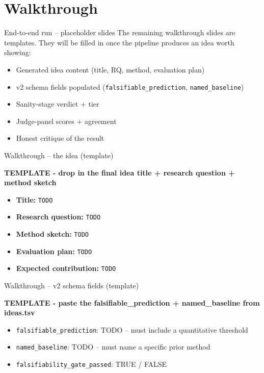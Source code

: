 \documentclass[10pt,aspectratio=169]{beamer}
\newcommand{\todoslide}[1]{%
  \begin{center}\large\color{warn}\bfseries TEMPLATE - #1\end{center}%
  \vspace{0.5em}%
}
\begin{document}

\section{Walkthrough}

\begin{frame}{End-to-end run -- placeholder slides}
  The remaining walkthrough slides are \alert{templates}. They will be
  filled in once the pipeline produces an idea worth showing:
  \begin{itemize}
    \item Generated idea content (title, RQ, method, evaluation plan)
    \item v2 schema fields populated (\texttt{falsifiable\_prediction},
      \texttt{named\_baseline})
    \item Sanity-stage verdict + tier
    \item Judge-panel scores + agreement
    \item Honest critique of the result
  \end{itemize}
\end{frame}

\begin{frame}{Walkthrough -- the idea (template)}
  \todoslide{drop in the final idea title + research question + method sketch}

  \begin{itemize}
    \item \textbf{Title:} \texttt{TODO}
    \item \textbf{Research question:} \texttt{TODO}
    \item \textbf{Method sketch:} \texttt{TODO}
    \item \textbf{Evaluation plan:} \texttt{TODO}
    \item \textbf{Expected contribution:} \texttt{TODO}
  \end{itemize}
\end{frame}

\begin{frame}{Walkthrough -- v2 schema fields (template)}
  \todoslide{paste the falsifiable\_prediction + named\_baseline from ideas.tsv}

  \begin{itemize}
    \item \texttt{falsifiable\_prediction}: \alert{TODO -- must include a quantitative threshold}
    \item \texttt{named\_baseline}: \alert{TODO -- must name a specific prior method}
    \item \texttt{falsifiability\_gate\_passed}: \alert{TRUE / FALSE}
  \end{itemize}
\end{frame}
\end{document}
